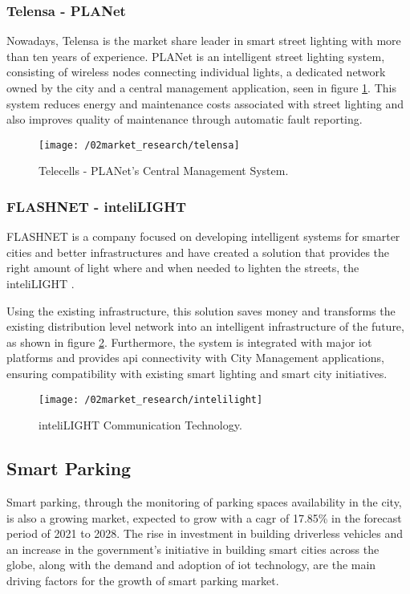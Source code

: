 \subsubsection{Telensa - PLANet}
Nowadays, Telensa is the market share leader in smart street lighting with more than ten years of experience.\cite{telensa} PLANet is an intelligent street lighting system, consisting of wireless nodes connecting individual lights, a dedicated network owned by the city and a central management application, seen in figure \ref{fig:telensa}. This system reduces energy and maintenance costs associated with street lighting and also improves quality of maintenance through automatic fault reporting.

\begin{figure}[ht]
	\centering
	\texttt{[image: /02market\_research/telensa]}
	\caption{Telecells - PLANet's Central Management System.}
	\label{fig:telensa}
\end{figure}

\subsubsection{FLASHNET - inteliLIGHT}
FLASHNET is a company focused on developing intelligent systems for smarter cities and better infrastructures and have created a solution that provides the right amount of light where and when needed to lighten the streets, the inteliLIGHT \cite{inteli_light}.

Using the existing infrastructure, this solution saves money and transforms the existing distribution level network into an intelligent infrastructure of the future, as shown in figure \ref{fig:intelilight}. Furthermore, the system is integrated with major \ac{iot} platforms and provides \ac{api} connectivity with City Management applications, ensuring compatibility with existing smart lighting and smart city initiatives.

\begin{figure}[ht]
	\centering
	\texttt{[image: /02market\_research/intelilight]}
	\caption{inteliLIGHT Communication Technology.}
	\label{fig:intelilight}
\end{figure}

\subsection{Smart Parking}
Smart parking, through the monitoring of parking spaces availability in the city, is also a growing market, expected to grow with a \ac{cagr} of 17.85\% in the forecast period of 2021 to 2028.\cite{smart_parking_market} The rise in investment in building driverless vehicles and an increase in the government’s initiative in building smart cities across the globe, along with the demand and adoption of \ac{iot} technology, are the main driving factors for the growth of smart parking market.

